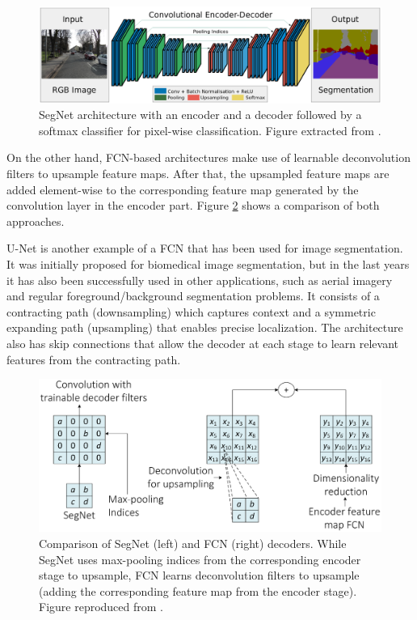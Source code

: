 \begin{figure}[!hbt]
	\includegraphics[width=\linewidth]{Figures/Segmentation/segnet.eps}
	\caption{SegNet architecture with an encoder and a decoder followed by a softmax classifier for pixel-wise classification. Figure extracted from \cite{Badrinarayanan2015}.}
	\label{fig:semseg:segnet}
\end{figure}

On the other hand, \acs{FCN}-based architectures make use of learnable deconvolution filters to upsample feature maps. After that, the upsampled feature maps are added element-wise to the corresponding feature map generated by the convolution layer in the encoder part. Figure \ref{fig:semseg:segnetvsfcn} shows a comparison of both approaches.

U-Net \cite{Ronneberger2015} is another example of a \acf{FCN} that has been used for image segmentation. It was initially proposed for biomedical image segmentation, but in the last years it has also been successfully used in other applications, such as aerial imagery \cite{Zhang2017} and regular foreground/background segmentation problems. It consists of a contracting path (downsampling) which captures context and a symmetric expanding path (upsampling) that enables precise localization. The architecture also has skip connections that allow the decoder at each stage to learn relevant features from the contracting path.

\begin{figure}[!hbt]
	\includegraphics[width=\linewidth]{Figures/Segmentation/segnetvsfcn_rework.eps}
	\caption{Comparison of SegNet (left) and \acs{FCN} (right) decoders. While SegNet uses max-pooling indices from the corresponding encoder stage to upsample, \acs{FCN} learns deconvolution filters to upsample (adding the corresponding feature map from the encoder stage). Figure reproduced from \cite{Badrinarayanan2015}.}
	\label{fig:semseg:segnetvsfcn}
\end{figure}

